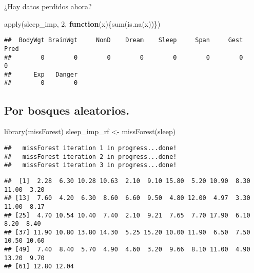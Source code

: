 \documentclass[
]{article}
\newenvironment{Shaded}{\begin{snugshade}}{\end{snugshade}}
\newcommand{\AttributeTok}[1]{\textcolor[rgb]{0.77,0.63,0.00}{#1}}
\newcommand{\ControlFlowTok}[1]{\textcolor[rgb]{0.13,0.29,0.53}{\textbf{#1}}}
\newcommand{\DecValTok}[1]{\textcolor[rgb]{0.00,0.00,0.81}{#1}}
\newcommand{\FunctionTok}[1]{\textcolor[rgb]{0.00,0.00,0.00}{#1}}
\newcommand{\NormalTok}[1]{#1}
\newcommand{\OtherTok}[1]{\textcolor[rgb]{0.56,0.35,0.01}{#1}}
\newcommand{\SpecialCharTok}[1]{\textcolor[rgb]{0.00,0.00,0.00}{#1}}
\begin{document}
¿Hay datos perdidos ahora?

\begin{Shaded}
\begin{Highlighting}[]
\FunctionTok{apply}\NormalTok{(sleep\_imp, }\DecValTok{2}\NormalTok{, }\ControlFlowTok{function}\NormalTok{(x)\{}\FunctionTok{sum}\NormalTok{(}\FunctionTok{is.na}\NormalTok{(x))\})}
\end{Highlighting}
\end{Shaded}

\begin{verbatim}
##  BodyWgt BrainWgt     NonD    Dream    Sleep     Span     Gest     Pred 
##        0        0        0        0        0        0        0        0 
##      Exp   Danger 
##        0        0
\end{verbatim}

\hypertarget{por-bosques-aleatorios.}{%
\subsection{Por bosques aleatorios.}\label{por-bosques-aleatorios.}}

\begin{Shaded}
\begin{Highlighting}[]
\FunctionTok{library}\NormalTok{(missForest)}
\NormalTok{sleep\_imp\_rf }\OtherTok{\textless{}{-}} \FunctionTok{missForest}\NormalTok{(sleep)}
\end{Highlighting}
\end{Shaded}

\begin{verbatim}
##   missForest iteration 1 in progress...done!
##   missForest iteration 2 in progress...done!
##   missForest iteration 3 in progress...done!
\end{verbatim}

\begin{Shaded}
\end{Shaded}

\begin{verbatim}
##  [1]  2.28  6.30 10.28 10.63  2.10  9.10 15.80  5.20 10.90  8.30 11.00  3.20
## [13]  7.60  4.20  6.30  8.60  6.60  9.50  4.80 12.00  4.97  3.30 11.00  8.17
## [25]  4.70 10.54 10.40  7.40  2.10  9.21  7.65  7.70 17.90  6.10  8.20  8.40
## [37] 11.90 10.80 13.80 14.30  5.25 15.20 10.00 11.90  6.50  7.50 10.50 10.60
## [49]  7.40  8.40  5.70  4.90  4.60  3.20  9.66  8.10 11.00  4.90 13.20  9.70
## [61] 12.80 12.04
\end{verbatim}
\end{document}
